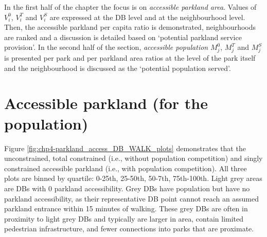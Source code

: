 \documentclass[
11pt, %
oneside, %
english, %
singlespacing, %
]{macthesis} %
\begin{document}
In the first half of the chapter the focus is on \emph{accessible parkland area}. Values of \(V^0_i\), \(V^T_i\) and \(V^S_i\) are expressed at the DB level and at the neighbourhood level. Then, the accessible parkland per capita ratio is demonstrated, neighbourhoods are ranked and a discussion is detailed based on `potential parkland service provision'. In the second half of the section, \emph{accessible population} \(M^0_j\), \(M^T_j\) and \(M^S_j\) is presented per park and per parkland area ratios at the level of the park itself and the neighbourhood is discussed as the `potential population served'.

\section{Accessible parkland (for the population)}\label{accessible-parkland-for-the-population}

Figure \ref{fig:chp4-parkland_access_DB_WALK_plots} demonstrates that the unconstrained, total constrained (i.e., without population competition) and singly constrained accessible parkland (i.e., with population competition). All three plots are binned by quartile: 0-25th, 25-50th, 50-7th, 75th-100th. Light grey areas are DBs with 0 parkland accessibility. Grey DBs have population but have no parkland accessibility, as their representative DB point cannot reach an assumed parkland entrance within 15 minutes of walking. These grey DBs are often in proximity to light grey DBs and typically are larger in area, contain limited pedestrian infrastructure, and fewer connections into parks that are proximate.
\end{document}
